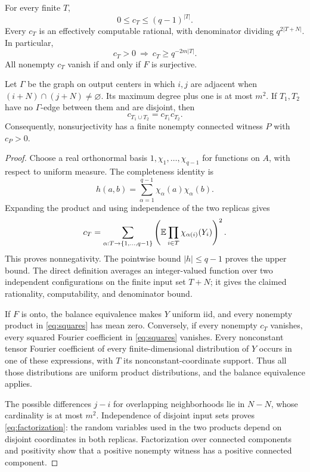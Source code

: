 \begin{lemma}\label{lem:collision}
For every finite \(T\),
\begin{equation}
 0\le c_T\le(q-1)^{|T|}.
\end{equation}
Every \(c_T\) is an effectively computable rational, with denominator dividing \(q^{2|T+N|}\). In particular,
\begin{equation}
 c_T>0\ \Longrightarrow\ c_T\ge q^{-2m|T|}.
 \label{eq:c-lower}
\end{equation}
All nonempty \(c_T\) vanish if and only if \(F\) is surjective.

Let \(\Gamma\) be the graph on output centers in which \(i,j\) are adjacent when \((i+N)\cap(j+N)\ne\varnothing\). Its maximum degree plus one is at most \(m^2\). If \(T_1,T_2\) have no \(\Gamma\)-edge between them and are disjoint, then
\begin{equation}
 c_{T_1\cup T_2}=c_{T_1}c_{T_2}.
 \label{eq:factorization}
\end{equation}
Consequently, nonsurjectivity has a finite nonempty connected witness \(P\) with \(c_P>0\).
\end{lemma}
\begin{proof}
Choose a real orthonormal basis \(1,\chi_1,\ldots,\chi_{q-1}\) for functions on \(A\), with respect to uniform measure. The completeness identity is
\begin{equation}
 h(a,b)=\sum_{\alpha=1}^{q-1}\chi_\alpha(a)\chi_\alpha(b).
\end{equation}
Expanding the product and using independence of the two replicas gives
\begin{equation}
 c_T=
 \sum_{\alpha:T\to\{1,\ldots,q-1\}}
 \left(\mathbb E\prod_{i\in T}\chi_{\alpha(i)}(Y_i)\right)^2.
 \label{eq:squares}
\end{equation}
This proves nonnegativity. The pointwise bound \(|h|\le q-1\) proves the upper bound. The direct definition averages an integer-valued function over two independent configurations on the finite input set \(T+N\); it gives the claimed rationality, computability, and denominator bound.

If \(F\) is onto, the balance equivalence makes \(Y\) uniform iid, and every nonempty product in \eqref{eq:squares} has mean zero. Conversely, if every nonempty \(c_T\) vanishes, every squared Fourier coefficient in \eqref{eq:squares} vanishes. Every nonconstant tensor Fourier coefficient of every finite-dimensional distribution of \(Y\) occurs in one of these expressions, with \(T\) its nonconstant-coordinate support. Thus all those distributions are uniform product distributions, and the balance equivalence applies.

The possible differences \(j-i\) for overlapping neighborhoods lie in \(N-N\), whose cardinality is at most \(m^2\). Independence of disjoint input sets proves \eqref{eq:factorization}: the random variables used in the two products depend on disjoint coordinates in both replicas. Factorization over connected components and positivity show that a positive nonempty witness has a positive connected component.
\end{proof}



